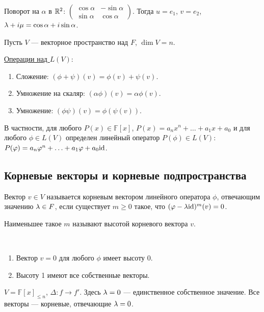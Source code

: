 \begin{Examples}
Поворот на $\alpha$ в $\mathbb{R}^2$: $
\begin{pmatrix}
\cos \alpha & -\sin \alpha \\
\sin \alpha & \cos \alpha  
\end{pmatrix}
$. Тогда $u = e_1$, $v = e_2$, $\lambda + i\mu = \cos \alpha + i\sin \alpha$.
\end{Examples}

Пусть $V$ --- векторное пространство над $F$, $\dim V = n$.

\vspace{0.2cm}
\underline{Операции над $L(V)$}:
\begin{enumerate}
\item Сложение: $(\phi + \psi)(v) = \phi(v) + \psi(v)$.
\item Умножение на скаляр: $(\alpha\phi)(v) = \alpha\phi(v)$.
\item Умножение: $(\phi\psi)(v) = \phi(\psi(v))$.
\end{enumerate}
В частности, для любого $P(x) \in \mathbb{F}[x]$, $P(x) = a_nx^n + \ldots + a_1x + a_0$ и для любого $\phi \in L(V)$ определен линейный оператор $P(\phi)\in L(V)$: $P(\varphi) = a_n \varphi^n + \ldots + a_1\varphi + a_0\mathrm{id}$.

\subsection*{Корневые векторы и корневые подпространства}

\begin{Def}
Вектор $v \in V$ называется корневым вектором линейного оператора $\phi$, отвечающим значению $\lambda \in F$, если существует $m \geqslant 0$ такое, что $(\varphi - \lambda\mathrm{id})^m(v) = 0$.

Наименьшее такое $m$ называют высотой корневого вектора $v$.
\end{Def}

\begin{Comment}\
\begin{enumerate}
\item Вектор $v = 0$ для любого $\phi$ имеет высоту 0.
\item Высоту 1 имеют все собственные векторы.
\end{enumerate}
\end{Comment}

\begin{Examples}
$V = \mathbb{F}[x]_{\leqslant n}$, $\Delta: f \rightarrow f'$. Здесь $\lambda = 0$ --- единственное собственное значение. Все векторы --- корневые, отвечающие $\lambda = 0$. 
\end{Examples}


